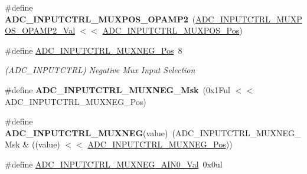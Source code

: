 \begin{DoxyCompactItemize}
\item 
\hypertarget{group___s_a_m_l21___a_d_c_gaad0df76632d51d47eb89f34c651f055e}{}\#define {\bfseries A\+D\+C\+\_\+\+I\+N\+P\+U\+T\+C\+T\+R\+L\+\_\+\+M\+U\+X\+P\+O\+S\+\_\+\+O\+P\+A\+M\+P2}~(\hyperlink{group___s_a_m_l21___a_d_c_ga001273137332d8cb5901e4fece2cadf8}{A\+D\+C\+\_\+\+I\+N\+P\+U\+T\+C\+T\+R\+L\+\_\+\+M\+U\+X\+P\+O\+S\+\_\+\+O\+P\+A\+M\+P2\+\_\+\+Val} $<$$<$ \hyperlink{group___s_a_m_l21___a_d_c_ga583868be285e1c06c9a93dfd552d8c6a}{A\+D\+C\+\_\+\+I\+N\+P\+U\+T\+C\+T\+R\+L\+\_\+\+M\+U\+X\+P\+O\+S\+\_\+\+Pos})\label{group___s_a_m_l21___a_d_c_gaad0df76632d51d47eb89f34c651f055e}

\item 
\hypertarget{group___s_a_m_l21___a_d_c_ga47f933ef105812dd56ccffab8f7a0877}{}\#define \hyperlink{group___s_a_m_l21___a_d_c_ga47f933ef105812dd56ccffab8f7a0877}{A\+D\+C\+\_\+\+I\+N\+P\+U\+T\+C\+T\+R\+L\+\_\+\+M\+U\+X\+N\+E\+G\+\_\+\+Pos}~8\label{group___s_a_m_l21___a_d_c_ga47f933ef105812dd56ccffab8f7a0877}

\begin{DoxyCompactList}\small\item\em (A\+D\+C\+\_\+\+I\+N\+P\+U\+T\+C\+T\+R\+L) Negative Mux Input Selection \end{DoxyCompactList}\item 
\hypertarget{group___s_a_m_l21___a_d_c_ga7f4645d2ed7208d0f2544c4e253d22a3}{}\#define {\bfseries A\+D\+C\+\_\+\+I\+N\+P\+U\+T\+C\+T\+R\+L\+\_\+\+M\+U\+X\+N\+E\+G\+\_\+\+Msk}~(0x1\+Ful $<$$<$ A\+D\+C\+\_\+\+I\+N\+P\+U\+T\+C\+T\+R\+L\+\_\+\+M\+U\+X\+N\+E\+G\+\_\+\+Pos)\label{group___s_a_m_l21___a_d_c_ga7f4645d2ed7208d0f2544c4e253d22a3}

\item 
\hypertarget{group___s_a_m_l21___a_d_c_gaa569c83b916a391e858848c6ac3c17f6}{}\#define {\bfseries A\+D\+C\+\_\+\+I\+N\+P\+U\+T\+C\+T\+R\+L\+\_\+\+M\+U\+X\+N\+E\+G}(value)~(A\+D\+C\+\_\+\+I\+N\+P\+U\+T\+C\+T\+R\+L\+\_\+\+M\+U\+X\+N\+E\+G\+\_\+\+Msk \& ((value) $<$$<$ \hyperlink{group___s_a_m_l21___a_d_c_ga47f933ef105812dd56ccffab8f7a0877}{A\+D\+C\+\_\+\+I\+N\+P\+U\+T\+C\+T\+R\+L\+\_\+\+M\+U\+X\+N\+E\+G\+\_\+\+Pos}))\label{group___s_a_m_l21___a_d_c_gaa569c83b916a391e858848c6ac3c17f6}

\item 
\hypertarget{group___s_a_m_l21___a_d_c_ga867dfa8f9e6a66a7a2ea43d6dbd13764}{}\#define \hyperlink{group___s_a_m_l21___a_d_c_ga867dfa8f9e6a66a7a2ea43d6dbd13764}{A\+D\+C\+\_\+\+I\+N\+P\+U\+T\+C\+T\+R\+L\+\_\+\+M\+U\+X\+N\+E\+G\+\_\+\+A\+I\+N0\+\_\+\+Val}~0x0ul\label{group___s_a_m_l21___a_d_c_ga867dfa8f9e6a66a7a2ea43d6dbd13764}


\end{DoxyCompactItemize}
